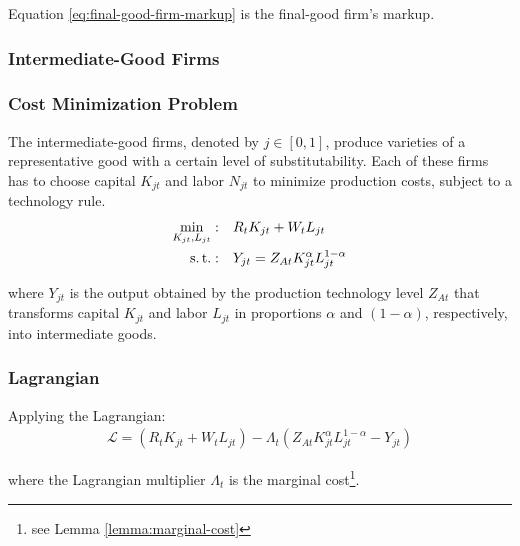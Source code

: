 \documentclass[
thesis.tex
]{subfiles}
\begin{document}
	Equation \ref{eq:final-good-firm-markup} is the final-good firm's markup.
	
	
	\subsubsection{Intermediate-Good Firms}
	
	\subsubsection*{Cost Minimization Problem}
	
	The intermediate-good firms, denoted by $j \in [0,1]$, produce varieties of a representative good with a certain level of substitutability. Each of these firms has to choose capital $K_{jt}$ and labor $N_{jt}$ to minimize production costs, subject to a technology rule.
	\begin{align}
		\label{eq:int-good-firm-total-cost}
		\min_{K_{jt}, L_{jt}}: \quad & R_t K_{jt} + W_t L_{jt} \\
		\label{eq:int-good-firm-production-function}
		\operatorname{s.t.}: \quad & Y_{jt} = Z_{At} K_{jt}^\alpha L_{jt}^{1-\alpha}
	\end{align}
	
	where $Y_{jt}$ is the output obtained by the production technology level $Z_{At}$\footnotemark{} that transforms capital $K_{jt}$ and labor $L_{jt}$ in proportions $\alpha$ and $(1-\alpha)$, respectively, into intermediate goods.
	
	
	\subsubsection*{Lagrangian}
	
	Applying the Lagrangian:
	\begin{align}
		\label{eq:int-good-firm-lagrangian}
		\mathcal{L} = (R_t K_{jt} + W_t L_{jt}) - \Lambda_t (Z_{At} K_{jt}^\alpha L_{jt}^{1-\alpha} - Y_{jt})
	\end{align}
	
	where the Lagrangian multiplier $\Lambda_t$ is the marginal cost\footnote{see Lemma \ref{lemma:marginal-cost}}.
	
\end{document}
